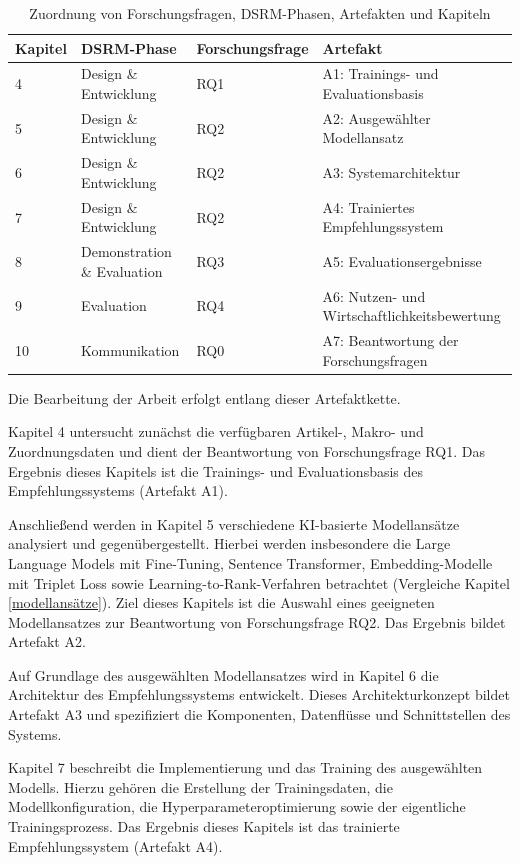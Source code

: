 \begin{table}[H] 
    \centering 
    \caption{Zuordnung von Forschungsfragen, DSRM-Phasen, Artefakten und Kapiteln} \label{tab:artefakte_dsrm} 
    \begin{tabular}{p{2cm}p{3cm}p{4cm}p{4cm}} 
        \hline Kapitel & DSRM-Phase & Forschungsfrage & Artefakt \\ 
        \hline 
        4 & Design \& Entwicklung & RQ1 & A1: Trainings- und Evaluationsbasis \\ 
        5 & Design \& Entwicklung & RQ2 & A2: Ausgewählter Modellansatz \\ 
        6 & Design \& Entwicklung & RQ2 & A3: Systemarchitektur \\ 
        7 & Design \& Entwicklung & RQ2 & A4: Trainiertes Empfehlungssystem \\ 
        8 & Demonstration \& Evaluation & RQ3 & A5: Evaluationsergebnisse \\ 
        9 & Evaluation & RQ4 & A6: Nutzen- und Wirtschaftlichkeitsbewertung \\ 
        10 & Kommunikation & RQ0 & A7: Beantwortung der Forschungsfragen \\ 
        \hline 
    \end{tabular} 
\end{table}


Die Bearbeitung der Arbeit erfolgt entlang dieser Artefaktkette. 

Kapitel 4 untersucht zunächst die verfügbaren Artikel-, Makro- und Zuordnungsdaten und dient der Beantwortung von Forschungsfrage RQ1. 
Das Ergebnis dieses Kapitels ist die Trainings- und Evaluationsbasis des Empfehlungssystems (Artefakt A1). 

Anschließend werden in Kapitel 5 verschiedene KI-basierte Modellansätze analysiert und gegenübergestellt. Hierbei werden insbesondere die Large Language Models mit Fine-Tuning, Sentence Transformer, 
Embedding-Modelle mit Triplet Loss sowie Learning-to-Rank-Verfahren betrachtet (Vergleiche Kapitel \ref{modellansätze}). Ziel dieses Kapitels ist die Auswahl eines geeigneten Modellansatzes zur Beantwortung von Forschungsfrage RQ2. 
Das Ergebnis bildet Artefakt A2. 

Auf Grundlage des ausgewählten Modellansatzes wird in Kapitel 6 die Architektur des Empfehlungssystems entwickelt. Dieses Architekturkonzept bildet Artefakt A3 und spezifiziert die Komponenten, 
Datenflüsse und Schnittstellen des Systems. 

Kapitel 7 beschreibt die Implementierung und das Training des ausgewählten Modells. Hierzu gehören die Erstellung der Trainingsdaten, die Modellkonfiguration, die Hyperparameteroptimierung sowie der eigentliche Trainingsprozess. 
Das Ergebnis dieses Kapitels ist das trainierte Empfehlungssystem (Artefakt A4). 

